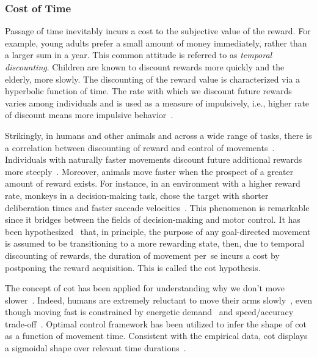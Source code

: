 \subsubsection{Cost of Time}
Passage of time inevitably incurs a cost to the subjective value of the reward.
For example, young adults prefer a small amount of money immediately, rather than a larger sum in a year.
This common attitude is referred to as \emph{temporal discounting}.
Children are known to discount rewards more quickly and the elderly, more slowly.
The discounting of the reward value is characterized via a hyperbolic function of time.
The rate with which we discount future rewards varies among individuals and is used as a measure of impulsively, i.e., higher rate of discount means more impulsive behavior~\cite{Choi2014JNeurosci}.
\par
Strikingly, in humans and other animals and across a wide range of tasks, there is a correlation between discounting of reward and control of movements~\cite{Shadmehr2010Jneurosci, Choi2014JNeurosci, Berret2018SciReports, Shadmehr2016CurrBiol, Berret2016JNeurosci}.
Individuals with naturally faster movements discount future additional rewards more steeply~\cite{Choi2014JNeurosci}.
Moreover, animals move faster when the prospect of a greater amount of reward exists.
For instance, in an environment with a higher reward rate, monkeys in a decision-making task, chose the target with shorter deliberation times and faster saccade velocities~\cite{Thura2014JNeurosci}.
This phenomenon is remarkable since it bridges between the fields of decision-making and motor control.
It has been hypothesized~\cite{Shadmehr2010Jneurosci} that, in principle, the purpose of any goal-directed movement is assumed to be transitioning to a more rewarding state, then, due to temporal discounting of rewards, the duration of movement per~se incurs a cost by postponing the reward acquisition.
This is called the \gls{cot} hypothesis.
\par
The concept of \gls{cot} has been applied for understanding why we don't move slower~\cite{Berret2016JNeurosci}.
Indeed, humans are extremely reluctant to move their arms slowly~\cite{Berret2018SciReports}, even though moving fast is constrained by energetic demand~\cite{Long2013RoSocInterface} and speed/accuracy trade-off~\cite{Harris2006BioCyber}.
Optimal control framework has been utilized to infer the shape of \gls{cot} as a function of movement time.
Consistent with the empirical data, \gls{cot} displays a sigmoidal shape over relevant time durations~\cite{Berret2016JNeurosci}.

